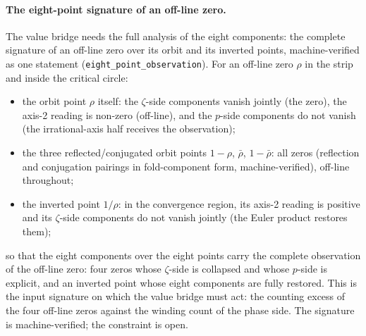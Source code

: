 \documentclass{article}
\newcommand{\zt}{\zeta}
\begin{document}
\paragraph{The eight-point signature of an off-line zero.}
The value bridge needs the full analysis of the eight components: the
complete signature of an off-line zero over its orbit and its inverted
points, machine-verified as one statement
(\texttt{eight\_point\_observation}). For an off-line zero $\rho$ in
the strip and inside the critical circle:
\begin{itemize}
\item the orbit point $\rho$ itself: the $\zt$-side components vanish
  jointly (the zero), the axis-2 reading is non-zero (off-line), and
  the $p$-side components do not vanish (the irrational-axis half
  receives the observation);
\item the three reflected/conjugated orbit points $1-\rho$, $\bar\rho$,
  $1-\bar\rho$: all zeros (reflection and conjugation pairings in
  fold-component form, machine-verified), off-line throughout;
\item the inverted point $1/\rho$: in the convergence region, its
  axis-2 reading is positive and its $\zt$-side components do not
  vanish jointly (the Euler product restores them);
\end{itemize}
so that the eight components over the eight points carry the complete
observation of the off-line zero: four zeros whose $\zt$-side is
collapsed and whose $p$-side is explicit, and an inverted point whose
eight components are fully restored. This is the input signature on
which the value bridge must act: the counting excess of the four
off-line zeros against the winding count of the phase side. The
signature is machine-verified; the constraint is open.
\end{document}
